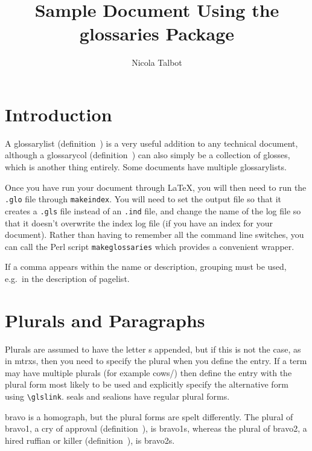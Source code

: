 \documentclass[a4paper]{report}
\begin{document}
\title{Sample Document Using the glossaries Package}
\author{Nicola Talbot}
\maketitle

\tableofcontents

\chapter{Introduction}

A \gls{glossarylist} (definition~) is a
very useful addition to any technical document, although a
\gls{glossarycol} (definition~) can also
simply be a collection of glosses, which is another thing entirely.
Some documents have multiple \glspl{glossarylist}.

Once you have run your document through \LaTeX, you
will then need to run the \texttt{.glo} file through
\texttt{makeindex}.  You will need to set the output
file so that it creates a \texttt{.gls} file instead
of an \texttt{.ind} file, and change the name of
the log file so that it doesn't overwrite the index
log file (if you have an index for your document).
Rather than having to remember all the command line
switches, you can call the \gls{Perl} script
\texttt{makeglossaries} which provides a convenient
wrapper.

If a comma appears within the name or description, grouping
must be used, e.g.\ in the description of \gls{pagelist}.

\chapter{Plurals and Paragraphs}

Plurals are assumed to have the letter s appended, but if this is
not the case, as in \glspl{mtrx}, then you need to specify the
plural when you define the entry. If a term may have multiple
plurals (for example \glspl{cow}/) then
define the entry with the plural form most likely to be used and
explicitly specify the alternative form using \verb|\glslink|.
\Glspl{seal} and \glspl{sealion} have regular plural forms.

\Gls{bravo} is a homograph, but the plural forms are spelt
differently. The plural of \gls{bravo1}, a cry of approval
(definition~), is \glspl{bravo1}, whereas the
plural of \gls{bravo2}, a hired ruffian or killer
(definition~), is \glspl{bravo2}.
\end{document}
